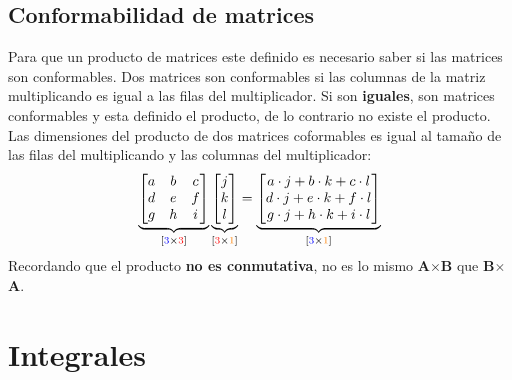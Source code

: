 \documentclass[
	11pt, %
	fleqn, %
	a4paper, %
]{LegrandOrangeBook}
\begin{document}
\subsection{Conformabilidad de matrices}
Para que un producto de matrices este definido es necesario saber si las matrices son conformables. Dos matrices son conformables si las columnas de la matriz multiplicando es igual a las filas del multiplicador. Si son \textbf{iguales}, son matrices conformables y esta definido el producto, de lo contrario no existe el producto. Las dimensiones del producto de dos matrices coformables es igual al tamaño de las filas del multiplicando y las columnas del multiplicador:
\begin{equation}\label{art:matricesconformables}
   \underbrace{\begin{bmatrix}
     a & b & c\\
     d & e & f\\
     g & h & i
   \end{bmatrix}}_{[\textcolor{blue}{3}\times \textcolor{red}{3}]}
   \underbrace{\begin{bmatrix}j \\k\\l \end{bmatrix}}_{[\textcolor{red}{3}\times \textcolor{orange}{1}]}
   =\underbrace{\begin{bmatrix}a\cdot j+b\cdot k +c\cdot l\\d\cdot j+e\cdot k +f\cdot l\\g\cdot j+h\cdot k +i\cdot l
\end{bmatrix}}_{[\textcolor{blue}{3}\times \textcolor{orange}{1}]}
\end{equation}
Recordando que el producto \textbf{no es conmutativa}, no es lo mismo \textbf{A}$\times$\textbf{B} que \textbf{B}$\times$\textbf{A}.
\section{Integrales}
\end{document}
